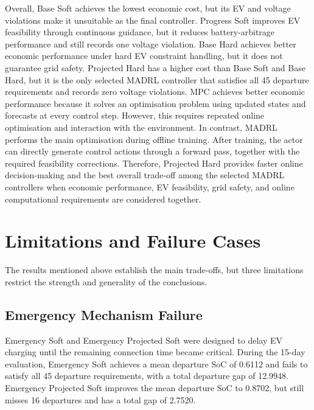 Overall, Base Soft achieves the lowest economic cost, but its EV and voltage violations make it unsuitable as the final controller. Progress Soft improves EV feasibility through continuous guidance, but it reduces battery-arbitrage performance and still records one voltage violation. Base Hard achieves better economic performance under hard EV constraint handling, but it does not guarantee grid safety. Projected Hard has a higher cost than Base Soft and Base Hard, but it is the only selected MADRL controller that satisfies all 45 departure requirements and records zero voltage violations. MPC achieves better economic performance because it solves an optimisation problem using updated states and forecasts at every control step. However, this requires repeated online optimisation and interaction with the environment. In contrast, MADRL performs the main optimisation during offline training. After training, the actor can directly generate control actions through a forward pass, together with the required feasibility corrections. Therefore, Projected Hard provides faster online decision-making and the best overall trade-off among the selected MADRL controllers when economic performance, EV feasibility, grid safety, and online computational requirements are considered together.

\section{Limitations and Failure Cases}\label{section:ch6-limitations}

The results mentioned above establish the main trade-offs, but three limitations restrict the strength and generality of the conclusions.

\subsection{Emergency Mechanism Failure}\label{subsection:ch6-eme-failure}

Emergency Soft and Emergency Projected Soft were designed to delay EV charging until the remaining connection time became critical. During the 15-day evaluation, Emergency Soft achieves a mean departure SoC of 0.6112 and fails to satisfy all 45 departure requirements, with a total departure gap of 12.9948. Emergency Projected Soft improves the mean departure SoC to 0.8702, but still misses 16 departures and has a total gap of 2.7520.

